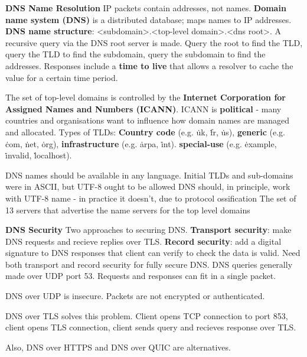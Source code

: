 \documentclass{article}
\begin{document}
\vspace{\baselineskip}
\textbf{DNS Name Resolution}
IP packets contain addresses, not names.
\textbf{Domain name system (DNS)} is a distributed database; maps names to IP addresses.
\textbf{DNS name structure}: <subdomain>.<top-level domain>.<dns root>.
A recursive query via the DNS root server is made. Query the root to find the TLD, query the TLD to find the subdomain,
query the subdomain to find the addresses.
Responses include a \textbf{time to live} that allows a resolver to cache the value for a certain time period.

\vspace{\baselineskip}
The set of top-level domains is controlled by the \textbf{Internet Corporation for Assigned Names and Numbers (ICANN)}.
ICANN is \textbf{political} {-} many countries and organisations want to influence how domain names are managed and allocated.
Types of TLDs:
\textbf{Country code} (e.g. \.uk, \.fr, \.us),
\textbf{generic} (e.g. \.com, \.net, \.org),
\textbf{infrastructure} (e.g. \.arpa, \.int).
\textbf{special-use} (e.g. \.example, \.invalid, \.localhost).

DNS names should be available in any language. Initial TLDs and sub-domains were in ASCII, but UTF-8 ought to be allowed
DNS should, in principle, work with UTF-8 name {-} in practice it doesn't, due to protocol ossification
The set of 13 servers that advertise the name servers for the top level domains

\vspace{\baselineskip}
\textbf{DNS Security}
Two approaches to securing DNS\@.
\textbf{Transport security}: make DNS requests and recieve replies over TLS\@.
\textbf{Record security}: add a digital signature to DNS responses that client can verify to check the data is valid.
Need both transport and record security for fully secure DNS\@.
DNS queries generally made over UDP port 53. Requests and responses can fit in a single packet.

DNS over UDP is insecure. Packets are not encrypted or authenticated.

DNS over TLS solves this problem. Client opens TCP connection to port 853, client opens TLS connection,
client sends query and recieves response over TLS\@.

Also, DNS over HTTPS and DNS over QUIC are alternatives.
\end{document}

